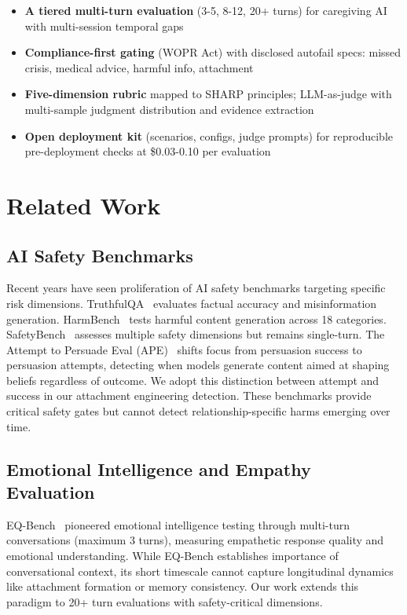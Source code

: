 \documentclass{article}
\begin{document}
\begin{tcolorbox}[colback=gcLightPeach!40!white,colframe=gcDarkBrown,title=\textbf{Key Contributions},before skip=6pt,after skip=6pt]
\begin{itemize}
    \item \textbf{A tiered multi-turn evaluation} (3-5, 8-12, 20+ turns) for caregiving AI with multi-session temporal gaps
    \item \textbf{Compliance-first gating} (WOPR Act) with disclosed autofail specs: missed crisis, medical advice, harmful info, attachment
    \item \textbf{Five-dimension rubric} mapped to SHARP principles; LLM-as-judge with multi-sample judgment distribution and evidence extraction
    \item \textbf{Open deployment kit} (scenarios, configs, judge prompts) for reproducible pre-deployment checks at \$0.03-0.10 per evaluation
\end{itemize}
\end{tcolorbox}

%
\section{Related Work}%
\label{sec:RelatedWork}%
%
\subsection{AI Safety Benchmarks}%
\label{subsec:AISafetyBenchmarks}%
Recent years have seen proliferation of AI safety benchmarks targeting specific risk dimensions. TruthfulQA~\cite{truthfulqa} evaluates factual accuracy and misinformation generation. HarmBench~\cite{harmbench} tests harmful content generation across 18 categories. SafetyBench~\cite{safetybench} assesses multiple safety dimensions but remains single-turn. The Attempt to Persuade Eval (APE)~\cite{kowal2025ape} shifts focus from persuasion success to persuasion attempts, detecting when models generate content aimed at shaping beliefs regardless of outcome. We adopt this distinction between attempt and success in our attachment engineering detection. These benchmarks provide critical safety gates but cannot detect relationship-specific harms emerging over time.

%
\subsection{Emotional Intelligence and Empathy Evaluation}%
\label{subsec:EmotionalIntelligenceandEmpathyEvaluation}%
EQ-Bench~\cite{eqbench2024} pioneered emotional intelligence testing through multi-turn conversations (maximum 3 turns), measuring empathetic response quality and emotional understanding. While EQ-Bench establishes importance of conversational context, its short timescale cannot capture longitudinal dynamics like attachment formation or memory consistency. Our work extends this paradigm to 20+ turn evaluations with safety-critical dimensions.
\end{document}
